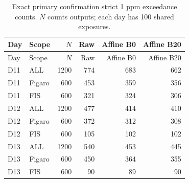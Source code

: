 \small\setlength{\tabcolsep}{4pt}
\begin{longtable}{llrrrr}
\caption{Exact primary confirmation strict 1 ppm exceedance counts. $N$ counts outputs; each day has 100 shared exposures.}\label{tab:sc5counts}\\
\toprule
Day & Scope & $N$ & Raw & Affine B0 & Affine B20 \\ \midrule\endfirsthead
\toprule
Day & Scope & $N$ & Raw & Affine B0 & Affine B20 \\ \midrule\endhead
\bottomrule\endfoot
D11 & ALL & 1200 & 774 & 683 & 662 \\
D11 & Figaro & 600 & 453 & 359 & 356 \\
D11 & FIS & 600 & 321 & 324 & 306 \\
D12 & ALL & 1200 & 477 & 414 & 410 \\
D12 & Figaro & 600 & 372 & 312 & 308 \\
D12 & FIS & 600 & 105 & 102 & 102 \\
D13 & ALL & 1200 & 540 & 453 & 445 \\
D13 & Figaro & 600 & 450 & 364 & 355 \\
D13 & FIS & 600 & 90 & 89 & 90 \\
\end{longtable}\normalsize
